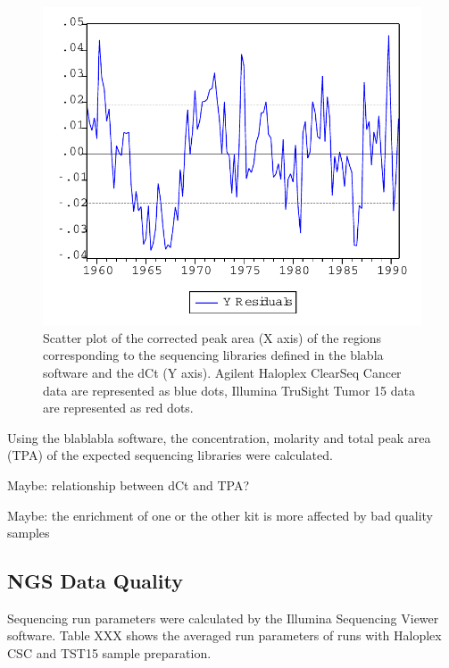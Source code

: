 \begin{figure}[!htbp]
  \begin{center}
    \includegraphics[scale=0.75,angle=0]{graph.pdf}
    \caption{Scatter plot of the corrected peak area (X axis) of the regions corresponding to the sequencing libraries defined in the blabla software and the dCt (Y axis). Agilent Haloplex ClearSeq Cancer data are represented as blue dots, Illumina TruSight Tumor 15 data are represented as red dots.}
    \label{Fig:bioanalyzer_scatter}
  \end{center}
\end{figure}

Using the blablabla software, the concentration, molarity and total peak area (TPA)
of the expected sequencing libraries were calculated.

Maybe: relationship between dCt and TPA?

Maybe: the enrichment of one or the other kit is more affected by bad quality samples

\subsection{NGS Data Quality}

Sequencing run parameters were calculated by the Illumina Sequencing Viewer software.
Table XXX shows the averaged run parameters of runs with Haloplex CSC and TST15
sample preparation.

